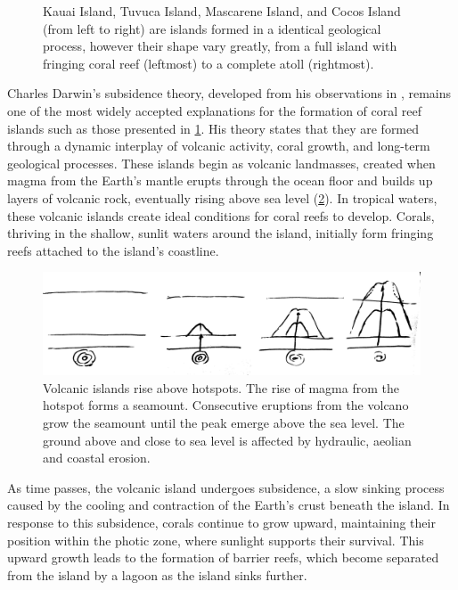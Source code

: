 \begin{figure}[H]
    \caption{Kauai Island, Tuvuca Island, Mascarene Island, and Cocos Island (from left to right) are islands formed in a identical geological process, however their shape vary greatly, from a full island with fringing coral reef (leftmost) to a complete atoll (rightmost).}
    \label{fig:coral-island-island-examples}
\end{figure}

Charles Darwin's subsidence theory, developed from his observations in \citep{Darwin1842}, remains one of the most widely accepted explanations for the formation of coral reef islands such as those presented in \cref{fig:coral-island-island-examples}. His theory states that they are formed through a dynamic interplay of volcanic activity, coral growth, and long-term geological processes. These islands begin as volcanic landmasses, created when magma from the Earth's mantle erupts through the ocean floor and builds up layers of volcanic rock, eventually rising above sea level (\cref{fig:coral-island-island-growth}). In tropical waters, these volcanic islands create ideal conditions for coral reefs to develop. Corals, thriving in the shallow, sunlit waters around the island, initially form fringing reefs attached to the island's coastline.

\begin{figure}[H]
    \centering
    \includegraphics[width = \linewidth]{other_images/Drawings/Volcano.jpg}
    \caption{Volcanic islands rise above hotspots. The rise of magma from the hotspot forms a seamount. Consecutive eruptions from the volcano grow the seamount until the peak emerge above the sea level. The ground above and close to sea level is affected by hydraulic, aeolian and coastal erosion.}
    \label{fig:coral-island-island-growth}
\end{figure}

As time passes, the volcanic island undergoes subsidence, a slow sinking process caused by the cooling and contraction of the Earth's crust beneath the island. In response to this subsidence, corals continue to grow upward, maintaining their position within the photic zone, where sunlight supports their survival. This upward growth leads to the formation of barrier reefs, which become separated from the island by a lagoon as the island sinks further.

